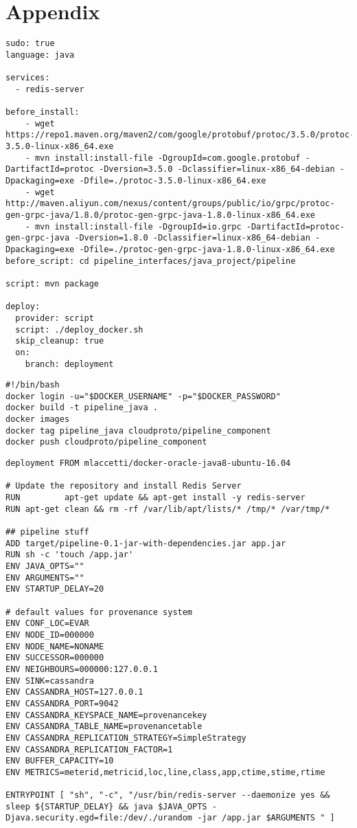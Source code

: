 \section{Appendix}

\begin{lstlisting}[label=lst:pipelineyaml, caption=.travis.yaml for pipeline component]
sudo: true
language: java

services:
  - redis-server

before_install:
    - wget https://repo1.maven.org/maven2/com/google/protobuf/protoc/3.5.0/protoc-3.5.0-linux-x86_64.exe
    - mvn install:install-file -DgroupId=com.google.protobuf -DartifactId=protoc -Dversion=3.5.0 -Dclassifier=linux-x86_64-debian -Dpackaging=exe -Dfile=./protoc-3.5.0-linux-x86_64.exe
    - wget http://maven.aliyun.com/nexus/content/groups/public/io/grpc/protoc-gen-grpc-java/1.8.0/protoc-gen-grpc-java-1.8.0-linux-x86_64.exe
    - mvn install:install-file -DgroupId=io.grpc -DartifactId=protoc-gen-grpc-java -Dversion=1.8.0 -Dclassifier=linux-x86_64-debian -Dpackaging=exe -Dfile=./protoc-gen-grpc-java-1.8.0-linux-x86_64.exe
before_script: cd pipeline_interfaces/java_project/pipeline

script: mvn package

deploy:
  provider: script
  script: ./deploy_docker.sh
  skip_cleanup: true
  on:
    branch: deployment
\end{lstlisting}


\begin{lstlisting}[label=lst:dockerdeploy, caption=docker deployment script  for pipeline component]
#!/bin/bash
docker login -u="$DOCKER_USERNAME" -p="$DOCKER_PASSWORD"
docker build -t pipeline_java .
docker images
docker tag pipeline_java cloudproto/pipeline_component
docker push cloudproto/pipeline_component
\end{lstlisting}

\begin{lstlisting}[label=lst:pipelinedockerfile, caption=Dockerfile for Pipeline Component] deployment FROM mlaccetti/docker-oracle-java8-ubuntu-16.04

# Update the repository and install Redis Server
RUN         apt-get update && apt-get install -y redis-server
RUN apt-get clean && rm -rf /var/lib/apt/lists/* /tmp/* /var/tmp/*

## pipeline stuff
ADD target/pipeline-0.1-jar-with-dependencies.jar app.jar
RUN sh -c 'touch /app.jar'
ENV JAVA_OPTS=""
ENV ARGUMENTS=""
ENV STARTUP_DELAY=20

# default values for provenance system
ENV CONF_LOC=EVAR
ENV NODE_ID=000000
ENV NODE_NAME=NONAME
ENV SUCCESSOR=000000
ENV NEIGHBOURS=000000:127.0.0.1
ENV SINK=cassandra
ENV CASSANDRA_HOST=127.0.0.1
ENV CASSANDRA_PORT=9042
ENV CASSANDRA_KEYSPACE_NAME=provenancekey
ENV CASSANDRA_TABLE_NAME=provenancetable
ENV CASSANDRA_REPLICATION_STRATEGY=SimpleStrategy
ENV CASSANDRA_REPLICATION_FACTOR=1
ENV BUFFER_CAPACITY=10
ENV METRICS=meterid,metricid,loc,line,class,app,ctime,stime,rtime

ENTRYPOINT [ "sh", "-c", "/usr/bin/redis-server --daemonize yes && sleep ${STARTUP_DELAY} && java $JAVA_OPTS -Djava.security.egd=file:/dev/./urandom -jar /app.jar $ARGUMENTS " ]
\end{lstlisting}